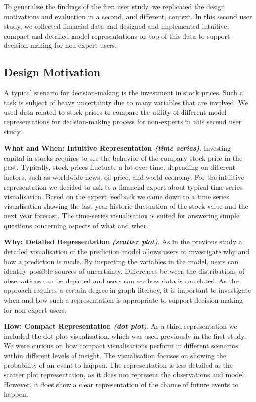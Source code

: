 \documentclass[final,5p,times,twocolumn,authoryear]{elsarticle}
\begin{document}
To generalise the findings of the first user study, we replicated the design motivations and evaluation in a second, and different, context. In this second user study, we collected financial data and designed and implemented intuitive, compact and detailed model representations on top of this data to support decision-making for non-expert users.  

\subsection{Design Motivation}

A typical scenario for decision-making is the investment in stock prices. Such a task is subject of heavy uncertainty due to many variables that are involved. We used data related to stock prices to compare the utility of different model representations for decision-making process for non-experts in this second user study.

\textbf{What and When: Intuitive Representation \emph{(time series)}}. Investing capital in stocks requires to see the behavior of the company stock price in the past. Typically, stock prices fluctuate a lot over time, depending on different factors, such as worldwide news, oil price, and world economy. For the intuitive representation we decided to ask to a financial expert about typical time series visualisation. Based on the expert feedback we came down to a time series visualisation showing the last year historic fluctuation of the stock value and the next year forecast. The time-series visualisation is suited for answering simple questions concerning aspects of what and when.

\textbf{Why: Detailed Representation \emph{(scatter plot)}}. As in the previous study a detailed visualisation of the prediction model allows users to investigate why and how a prediction is made. By inspecting the variables in the model, users can identify possible sources of uncertainty. Differences between the distributions of observations can be depicted and users can see how data is correlated. As the approach requires a certain degree in graph literacy, it is important to investigate when and how such a representation is appropriate to support decision-making for non-expert users.

\textbf{How: Compact Representation \emph{(dot plot)}}. As a third representation we included the dot plot visualisation, which was used previously in the first study. We were curious on how compact visualisations perform in different scenarios within different levels of insight. The visualisation focuses on showing the probability of an event to happen. The representation is less detailed as the scatter plot representation, as it does not represent the observations and model. However, it does show a clear representation of the chance of future events to happen. 
\end{document}
